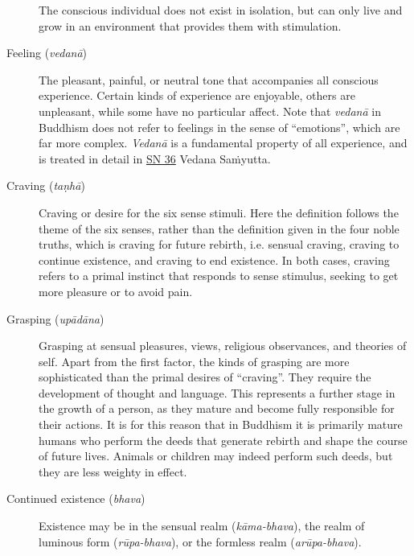 \documentclass[12pt,openany]{book}%
\begin{document}
\begin{description}
The conscious individual does not exist in isolation, but can only live and grow in an environment that provides them with stimulation.%
\item[Feeling (\textit{\textsanskrit{vedanā}})] The pleasant, painful, or neutral tone that accompanies all conscious experience.
Certain kinds of experience are enjoyable, others are unpleasant, while some have no particular affect. Note that \textit{\textsanskrit{vedanā}} in Buddhism does not refer to feelings in the sense of “emotions”, which are far more complex. \textit{\textsanskrit{Vedanā}} is a fundamental property of all experience, and is treated in detail in \href{https://suttacentral.net/sn36}{SN 36} Vedana \textsanskrit{Saṁyutta}.%
\item[Craving (\textit{\textsanskrit{taṇhā}})] Craving or desire for the six sense stimuli.
Here the definition follows the theme of the six senses, rather than the definition given in the four noble truths, which is craving for future rebirth, i.e. sensual craving, craving to continue existence, and craving to end existence. In both cases, craving refers to a primal instinct that responds to sense stimulus, seeking to get more pleasure or to avoid pain.%
\item[Grasping (\textit{\textsanskrit{upādāna}})] Grasping at sensual pleasures, views, religious observances, and theories of self.
Apart from the first factor, the kinds of grasping are more sophisticated than the primal desires of “craving”. They require the development of thought and language. This represents a further stage in the growth of a person, as they mature and become fully responsible for their actions. It is for this reason that in Buddhism it is primarily mature humans who perform the deeds that generate rebirth and shape the course of future lives. Animals or children may indeed perform such deeds, but they are less weighty in effect.%
\item[Continued existence (\textit{bhava})] Existence may be in the sensual realm (\textit{\textsanskrit{kāma}-bhava}), the realm of luminous form (\textit{\textsanskrit{rūpa}-bhava}), or the formless realm (\textit{\textsanskrit{arūpa}-bhava}).

\end{description}
\end{document}
